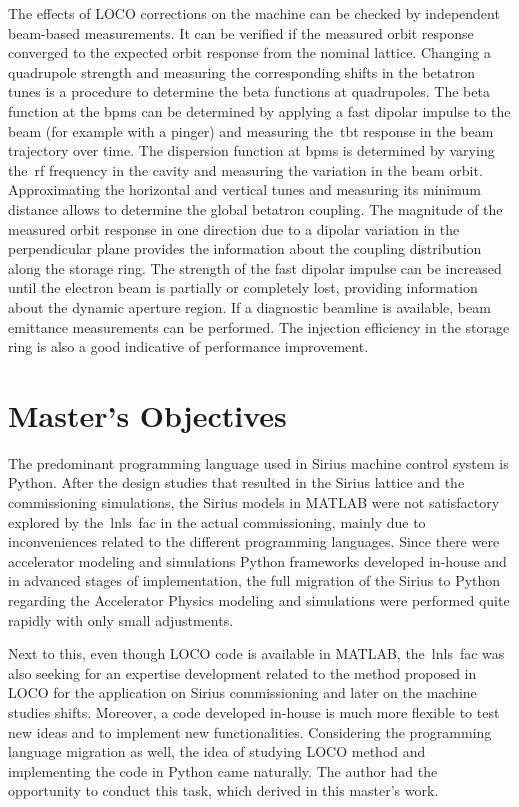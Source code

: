 The effects of LOCO corrections on the machine can be checked by independent beam-based measurements. It can be verified if the measured orbit response converged to the expected orbit response from the nominal lattice. Changing a quadrupole strength and measuring the corresponding shifts in the betatron tunes is a procedure to determine the beta functions at quadrupoles. The beta function at the \glspl{bpm} can be determined by applying a fast dipolar impulse to the beam (for example with a pinger) and measuring the~\gls{tbt} response in the beam trajectory over time. The dispersion function at \glspl{bpm} is determined by varying the~\gls{rf} frequency in the cavity and measuring the variation in the beam orbit. Approximating the horizontal and vertical tunes and measuring its minimum distance allows to determine the global betatron coupling. The magnitude of the measured orbit response in one direction due to a dipolar variation in the perpendicular plane provides the information about the coupling distribution along the storage ring. The strength of the fast dipolar impulse can be increased until the electron beam is partially or completely lost, providing information about the dynamic aperture region. If a diagnostic beamline is available, beam emittance measurements can be performed. The injection efficiency in the storage ring is also a good indicative of performance improvement.
\section{Master's Objectives}\label{sec:master_obj}
The predominant programming language used in Sirius machine control system is Python. After the design studies that resulted in the Sirius lattice and the commissioning simulations, the Sirius models in MATLAB were not satisfactory explored by the~\gls{lnls}~\gls{fac} in the actual commissioning, mainly due to inconveniences related to the different programming languages. Since there were accelerator modeling and simulations Python frameworks developed in-house and in advanced stages of implementation, the full migration of the Sirius to Python regarding the Accelerator Physics modeling and simulations were performed quite rapidly with only small adjustments.
 
Next to this, even though LOCO code is available in MATLAB, the~\gls{lnls}~\gls{fac} was also seeking for an expertise development related to the method proposed in LOCO for the application on Sirius commissioning and later on the machine studies shifts. Moreover, a code developed in-house is much more flexible to test new ideas and to implement new functionalities. Considering the programming language migration as well, the idea of studying LOCO method and implementing the code in Python came naturally. The author had the opportunity to conduct this task, which derived in this master's work. 

